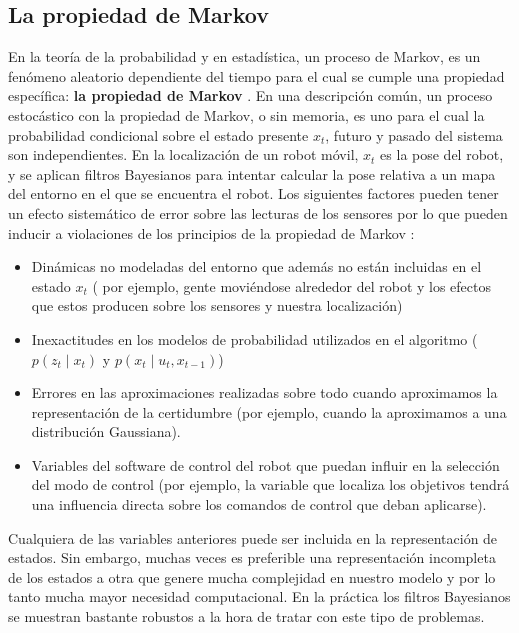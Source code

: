 \subsection{La propiedad de Markov} \label{subsec:prop_markov}
En la teoría de la probabilidad y en estadística, un proceso de Markov, es un fenómeno aleatorio dependiente del tiempo para el cual se cumple una propiedad específica: \textbf{la propiedad de Markov} \cite{markov_prop}\cite{proceso_2014_markov}. En una descripción común, un proceso estocástico con la propiedad de Markov, o sin memoria, es uno para el cual la probabilidad condicional sobre el estado presente $x_{t}$, futuro y pasado del sistema son independientes.
%
%
%
En la localización de un robot móvil, $x_{t}$ es la pose del robot, y se aplican filtros Bayesianos para intentar calcular la pose relativa a un mapa del entorno en el que se encuentra el robot.
Los siguientes factores pueden tener un efecto sistemático de error sobre las lecturas de los sensores por lo que pueden inducir a violaciones de los principios de la propiedad de Markov \cite{thrun_probabilistic_2005}:
\begin{itemize}
	\item Dinámicas no modeladas del entorno que además no están incluidas en el estado $x_{t}$ ( por ejemplo, gente moviéndose alrededor del robot y los efectos que estos producen sobre los sensores y nuestra localización)
	\item Inexactitudes en los modelos de probabilidad utilizados en el algoritmo ($p(z_{t} \mid x_{t})$ y $p(x_{t} \mid u_{t},x_{t-1})$)
    \item Errores en las aproximaciones realizadas sobre todo cuando aproximamos la representación de la certidumbre (por ejemplo, cuando la aproximamos a una distribución Gaussiana).
    \item Variables del software de control del robot que puedan influir en la selección del modo de control (por ejemplo, la variable que localiza los objetivos tendrá una influencia directa sobre los comandos de control que deban aplicarse).
\end{itemize}

Cualquiera de las variables anteriores puede ser incluida en la representación de estados. Sin embargo, muchas veces es preferible una representación incompleta de los estados a otra que genere mucha complejidad en nuestro modelo y por lo tanto mucha mayor necesidad computacional.
En la práctica los filtros Bayesianos se muestran bastante robustos a la hora de tratar con este tipo de problemas. 

